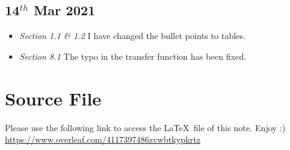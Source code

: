 \documentclass[12pt,a4paper]{article}
\begin{document}
\subsection*{14$^{th}$ Mar 2021}
\begin{itemize}
\item \textit{Section 1.1 \& 1.2} \quad I have changed the bullet points to tables.
\item \textit{Section 8.1} \quad The typo in the transfer function has been fixed.
\end{itemize}

\section*{Source File}
Please use the following link to access the \LaTeX \ file of this note. Enjoy :)\\
\url{https://www.overleaf.com/4117397486zvwbtkypkrtz} 

\newpage
\tableofcontents%
\newpage
\end{document}
